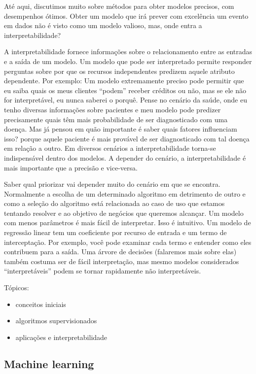 \documentclass[
  letterpaper,
  DIV=11,
  numbers=noendperiod]{scrreprt}
\begin{document}
Até aqui, discutimos muito sobre métodos para obter modelos precisos,
com desempenhos ótimos. Obter um modelo que irá prever com excelência um
evento em dados não é visto como um modelo valioso, mas, onde entra a
interpretabilidade?

A interpretabilidade fornece informações sobre o relacionamento entre as
entradas e a saída de um modelo. Um modelo que pode ser interpretado
permite responder perguntas sobre por que os recursos independentes
predizem aquele atributo dependente. Por exemplo: Um modelo extremamente
preciso pode permitir que eu saiba quais os meus clientes ``podem''
receber créditos ou não, mas se ele não for interpretável, eu nunca
saberei o porquê. Pense no cenário da saúde, onde eu tenho diversas
informações sobre pacientes e meu modelo pode predizer precisamente
quais têm mais probabilidade de ser diagnosticado com uma doença. Mas já
pensou em quão importante é saber quais fatores influenciam isso? porque
aquele paciente é mais provável de ser diagnosticado com tal doença em
relação a outro. Em diversos cenários a interpretabilidade torna-se
indispensável dentro dos modelos. A depender do cenário, a
interpretabilidade é mais importante que a precisão e vice-versa.

Saber qual priorizar vai depender muito do cenário em que se encontra.
Normalmente a escolha de um determinado algoritmo em detrimento de outro
e como a seleção do algoritmo está relacionada ao caso de uso que
estamos tentando resolver e ao objetivo de negócios que queremos
alcançar. Um modelo com menos parâmetros é mais fácil de interpretar.
Isso é intuitivo. Um modelo de regressão linear tem um coeficiente por
recurso de entrada e um termo de interceptação. Por exemplo, você pode
examinar cada termo e entender como eles contribuem para a saída. Uma
árvore de decisões (falaremos mais sobre elas) também costuma ser de
fácil interpretação, mas mesmo modelos considerados ``interpretáveis''
podem se tornar rapidamente não interpretáveis.

\hfill\break

Tópicos:

\begin{itemize}
\item
  conceitos iniciais
\item
  algoritmos supervisionados
\item
  aplicações e interpretabilidade
\end{itemize}

\hypertarget{machine-learning}{%
\subsection{Machine learning}\label{machine-learning}}
\end{document}
